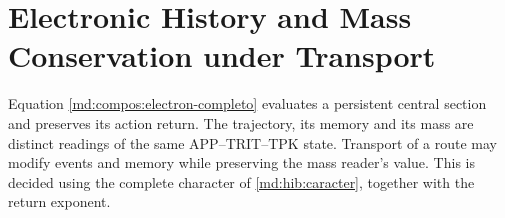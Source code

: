 \section{Electronic History and Mass Conservation under Transport}
\label{md:r27:electron}

Equation \eqref{md:compos:electron-completo} evaluates a persistent central
section and preserves its action return. The trajectory, its memory and
its mass are distinct readings of the same APP--TRIT--TPK state.
Transport of a route may modify events and memory while preserving the mass
reader's value. This is decided using the complete character of
\eqref{md:hib:caracter}, together with the return exponent.

